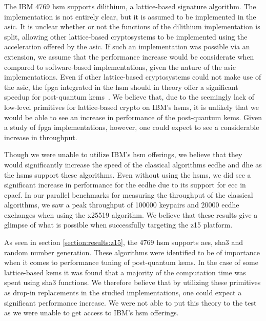 The IBM 4769 \gls{hsm} supports \gls{dilithium}, a lattice-based signature algorithm. The implementation is not entirely clear, but it is assumed to be implemented in the \gls{asic}. It is unclear whether or not the functions of the \gls{dilithium} implementation is split, allowing other lattice-based cryptosystems to be implemented using the acceleration offered by the \gls{asic}. If such an implementation was possible via an extension, we assume that the performance increase would be considerate when compared to software-based implementations, given the nature of the \gls{asic} implementations. Even if other lattice-based cryptosystems could not make use of the \gls{asic}, the \gls{fpga} integrated in the \gls{hsm} should in theory offer a significant speedup for \gls{post-quantum} \glspl{kem}~\cite{zhu2021, roy2020}. We believe that, due to the seemingly lack of low-level primitives for lattice-based crypto on IBM's \glspl{hsm}, it is unlikely that we would be able to see an increase in performance of the \gls{post-quantum} \glspl{kem}. Given a study of \gls{fpga} implementations, however, one could expect to see a considerable increase in throughput.

Though we were unable to utilize IBM's \gls{hsm} offerings, we believe that they would significantly increase the speed of the classical algorithms \gls{ecdhe} and \gls{dhe} as the \glspl{hsm} support these algorithms. Even without using the \glspl{hsm}, we did see a significant increase in performance for the \gls{ecdhe} due to its support for \gls{ecc} in \gls{cpacf}. In our parallel benchmarks for measuring the throughput of the classical algorithms, we saw a peak throughput of 100000 keypairs and 20000 \gls{ecdhe} exchanges when using the \gls{x25519} algorithm. We believe that these results give a glimpse of what is possible when successfully targeting the \gls{z15} platform. 

As seen in section \ref{section:results:z15}, the 4769 \gls{hsm} supports \gls{aes}, \gls{sha3} and random number generation. These algorithms were identified to be of importance when it comes to performance tuning of \gls{post-quantum} \glspl{kem}. In the case of some lattice-based \glspl{kem} it was found that a majority of the computation time was spent using \gls{sha3} functions. We therefore believe that by utilizing these primitives as drop-in replacements in the studied implementations, one could expect a significant performance increase. We were not able to put this theory to the test as we were unable to get access to IBM's \gls{hsm} offerings.

